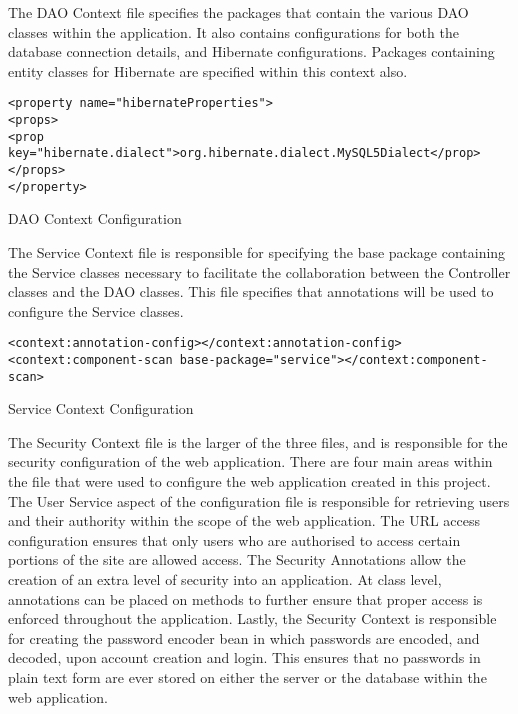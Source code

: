 The DAO Context file specifies the packages that contain the various DAO classes within the application. It also contains configurations for both the database connection details, and Hibernate configurations. Packages containing entity classes for Hibernate are specified within this context also. \newline

\begin{table}[H]
\begin{lstlisting}
<property name="hibernateProperties">
<props>
<prop key="hibernate.dialect">org.hibernate.dialect.MySQL5Dialect</prop>
</props>
</property>
\end{lstlisting}
\caption{DAO Context Configuration}
\end{table}

The Service Context file is responsible for specifying the base package containing the Service classes necessary to facilitate the collaboration between the Controller classes and the DAO classes. This file specifies that annotations will be used to configure the Service classes.\newline

\begin{table}[H]
\begin{lstlisting}
<context:annotation-config></context:annotation-config>
<context:component-scan base-package="service"></context:component-scan>
\end{lstlisting}
\caption{Service Context Configuration}
\end{table}

The Security Context file is the larger of the three files, and is responsible for the security configuration of the web application. There are four main areas within the file that were used to configure the web application created in this project. \newline The User Service aspect of the configuration file is responsible for retrieving users and their authority within the scope of the web application. \newline The URL access configuration ensures that only users who are authorised to access certain portions of the site are allowed access. \newline The Security Annotations allow the creation of an extra level of security into an application. At class level, annotations can be placed on methods to further ensure that proper access is enforced throughout the application. \newline Lastly, the Security Context is responsible for creating the password encoder bean in which passwords are encoded, and decoded, upon account creation and login. This ensures that no passwords in plain text form are ever stored on either the server or the database within the web application. \newline

